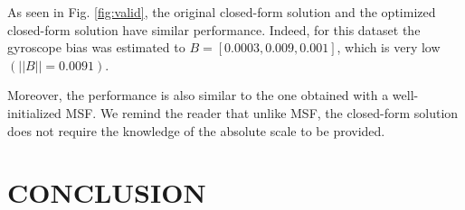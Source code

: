 \documentclass[letterpaper, 10 pt, journal, final]{ieeeconf}  %
\begin{document}
As seen in Fig. \ref{fig:valid}, the original closed-form solution and the optimized closed-form solution have similar performance.
Indeed, for this dataset the gyroscope bias was estimated to $B = [0.0003, 0.009, 0.001]$, which is very low $(||B|| = 0.0091)$.

Moreover, the performance is also similar to the one obtained with a well-initialized MSF.
We remind the reader that unlike MSF, the closed-form solution does not require the knowledge of the absolute scale to be provided.






\section{CONCLUSION}\label{SectionConclusion}

\end{document}
